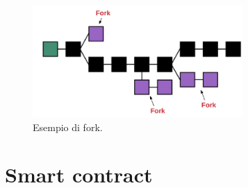 \documentclass[a4paper,11pt]{report}
\begin{document}
\begin{figure}[htbp] 
\begin{center}
\includegraphics[width=8cm]{img/fork.png} 
\end{center}
\caption{Esempio di fork.}
\end{figure}

\chapter{Smart contract}
\end{document}
